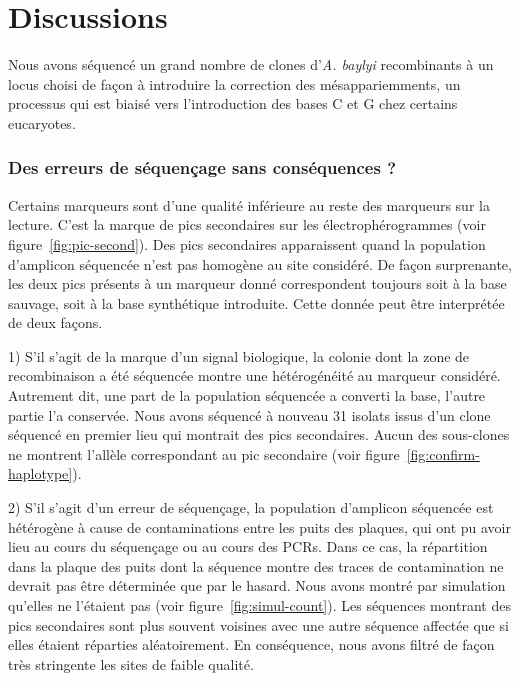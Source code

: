 \blankpage
\null
\vfill



\vfill
\thispagestyle{empty}
\addtocounter{page}{-1}
\clearpage
\newpage

\section{Discussions}
\label{sec:discussions}

Nous avons séquencé un grand nombre de clones d'\emph{A. baylyi} recombinants à
un locus choisi de façon à introduire la correction des mésappariemments, un
processus qui est biaisé vers l'introduction des bases C et G chez certains
eucaryotes.

\subsubsection{Des erreurs de séquençage sans conséquences ?}
\label{sub:discu-conta}

Certains marqueurs sont d'une qualité inférieure au reste des marqueurs sur la
lecture. C'est la marque de pics secondaires sur les électrophérogrammes (voir
figure~\ref{fig:pic-second}). Des pics secondaires apparaissent quand la
population d'amplicon séquencée n'est pas homogène au site considéré. De façon
surprenante, les deux pics présents à un marqueur donné correspondent toujours
soit à la base sauvage, soit à la base synthétique introduite. Cette donnée peut
être interprétée de deux façons.

1) S'il s'agit de la marque d'un signal biologique, la colonie dont la zone de
recombinaison a été séquencée montre une hétérogénéité au marqueur considéré.
Autrement dit, une part de la population séquencée a converti la base, l'autre
partie l'a conservée. Nous avons séquencé à nouveau 31 isolats issus d'un clone
séquencé en premier lieu qui montrait des pics secondaires. Aucun des
sous-clones ne montrent l'allèle correspondant au pic secondaire (voir
figure~\ref{fig:confirm-haplotype}).

2) S'il s'agit d'un erreur de séquençage, la population d'amplicon séquencée est
hétérogène à cause de contaminations entre les puits des plaques, qui ont pu
avoir lieu au cours du séquençage ou au cours des PCRs. Dans ce cas, la
répartition dans la plaque des puits dont la séquence montre des traces de
contamination ne devrait pas être déterminée que par le hasard. Nous avons
montré par simulation qu'elles ne l'étaient pas (voir
figure~\ref{fig:simul-count}). Les séquences montrant des pics secondaires sont
plus souvent voisines avec une autre séquence affectée que si elles étaient
réparties aléatoirement. En conséquence, nous avons filtré de façon très
stringente les sites de faible qualité.

